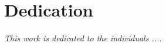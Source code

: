 \chapter*{Dedication}

    \newlength{\originalparskip}
    \setlength{\originalparskip}{\parskip}

    \setlength{\parskip}{1cm}
    \begin{center}
    {\itshape
    This work is dedicated to the individuals .... 
    }
    \end{center}
    \setlength{\parskip}{\originalparskip}

